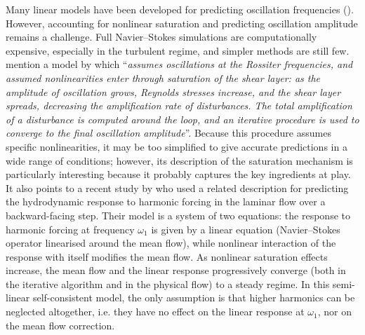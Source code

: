\documentclass[11pt,onecolumn]{article}
\begin{document}
Many linear models have been developed for predicting oscillation frequencies (\cite{Rossiter1964, Tam1978, Kooijman2004, Alvarez2004}). However, accounting for nonlinear saturation and predicting oscillation amplitude remains a challenge. 
Full Navier--Stokes simulations are computationally expensive, especially in the turbulent regime, and simpler methods are still few.
\cite{Rowley2006} mention a model by \cite{Cain1996} which ``\textit{assumes oscillations at the Rossiter frequencies, and assumed nonlinearities enter through saturation of the shear layer: as the amplitude of oscillation grows, Reynolds stresses increase, and the shear layer spreads, decreasing the amplification rate of disturbances. The total amplification of a disturbance is computed around the loop, and an iterative procedure is used to converge to the final oscillation amplitude}''.
%
Because this procedure assumes specific nonlinearities, it may be too simplified to give accurate predictions in a wide range of conditions; however, its description of the saturation mechanism is particularly interesting because it probably captures the key ingredients at play.
It also points to a recent study by \cite{Mantic2016} who used a related description for  predicting the hydrodynamic response to harmonic forcing in the laminar flow over a backward-facing step. Their model is a system of two equations: the response to harmonic forcing at frequency $\omega_1$ is given by a linear equation (Navier--Stokes operator linearised around the mean flow), while nonlinear interaction of the response with itself modifies the mean flow. 
As nonlinear saturation effects increase, the mean flow and the linear response progressively converge (both in the iterative algorithm and in the physical flow) to a steady regime. 
In this semi-linear self-consistent model, the only assumption is that higher harmonics can be neglected altogether, i.e. they have no effect on the linear response at $\omega_1$, nor on the mean flow correction. 
\end{document}
